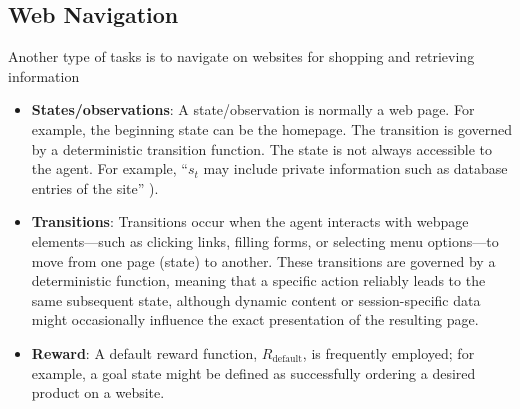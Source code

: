 \subsection{Web Navigation}
\label{sec:web}
Another type of tasks is to  navigate on websites for shopping and retrieving information \citep{zhou2024webarena} 
\begin{itemize}
    \item \textbf{States/observations}: A state/observation is normally a web page. For example, the beginning state can be the homepage. The transition is governed by a deterministic transition function.
    The state is not always accessible to the agent. For example, ``$s_t$ may include private information such as database entries of the site'' \citep{koh2024tree}).

    \item \textbf{Transitions}: Transitions occur when the agent interacts with webpage elements—such as clicking links, filling forms, or selecting menu options—to move from one page (state) to another. These transitions are governed by a deterministic function, meaning that a specific action reliably leads to the same subsequent state, although dynamic content or session-specific data might occasionally influence the exact presentation of the resulting page.
    
    \item \textbf{Reward}: A default reward function, $R_\text{default}$, is frequently employed; for example, a goal state might be defined as successfully ordering a desired product on a website.
\end{itemize}

